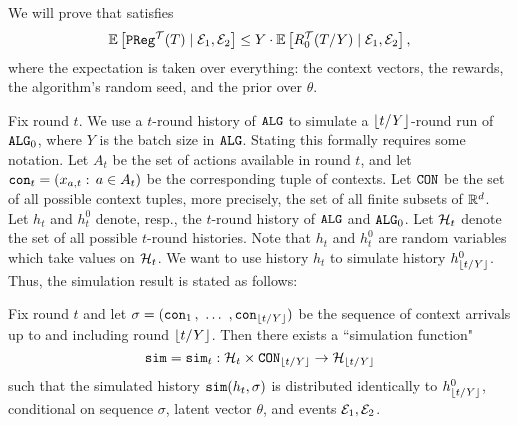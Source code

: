 We will prove that \ALG satisfies
\begin{align}\label{eq:bg-cond}
\mathbb{E}\left[\mathtt{PReg}^{{\mathcal{T}}}(T) \;|\; \mathcal{E}_1, \mathcal{E}_2\right]
    \leq Y \cdot \mathbb{E}\left[R^{{\mathcal{T}}}_0(T/Y) \;|\; \mathcal{E}_1, \mathcal{E}_2\right],
\end{align}
where the expectation is taken over everything: the context vectors, the rewards, the algorithm's random seed, and the prior over $\theta$.


Fix round $t$. We use a $t$-round history of $\mathtt{ALG}$ to simulate a ${\lfloor t/Y \rfloor}$-round run of $\mathtt{ALG}_0$, where $Y$ is the batch size in $\mathtt{ALG}$. Stating this formally requires some notation.  Let $A_t$ be the set of actions available in round $t$, and let
    $\mathtt{con}_t = (x_{a,t}:\, a\in A_t)$
be the corresponding tuple of contexts. Let $\mathtt{CON}$ be the set of all possible context tuples, more precisely, the set of all finite subsets of $\mathbb{R}^d$. Let $h_t$ and $h^0_t$ denote, resp., the $t$-round history of $\mathtt{ALG}$ and $\mathtt{ALG}_0$. Let $\mathcal{H}_t$  denote the set of all possible $t$-round histories. Note that $h_t$ and $h^0_t$ are random variables which take values on $\mathcal{H}_t$.  We want to use history $h_t$ to simulate history $h^0_{\lfloor t/Y \rfloor}$. Thus, the simulation result is stated as follows:

\begin{lemma}\label{lm:bg-simulation}
Fix round $t$ and let $\sigma = (\mathtt{con}_1 \, ,\ \ldots\ , \mathtt{con}_{\lfloor t/Y \rfloor})$ be the sequence of context arrivals up to and including round ${\lfloor t/Y \rfloor}$. Then there exists a ``simulation function"
    \[ \mathtt{sim} = \mathtt{sim}_t: \mathcal{H}_t\times \mathtt{CON}_{{\lfloor t/Y \rfloor}} \to \mathcal{H}_{{\lfloor t/Y \rfloor}} \]
such that the simulated history $\mathtt{sim}(h_t,\sigma)$ is distributed identically to $h^0_{{\lfloor t/Y \rfloor}}$, conditional on sequence $\sigma$, latent vector $\theta$, and events $\mathcal{E}_1,\mathcal{E}_2$.
\end{lemma}

